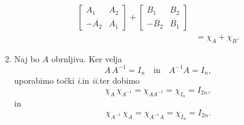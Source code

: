 \documentclass[mat1, tisk]{fmfdelo}
\numberwithin{equation}{section}
\begin{document}
\begin{dokaz}
\begin{enumerate}
\begin{equation*}
\begin{aligned}
\begin{bmatrix}
                        A_{1} & A_{2} \\
                        -\overline{A_{2}} & \overline{A_{1}}
                    \end{bmatrix} 
                    +
                    \begin{bmatrix}
                        B_{1} & B_{2}\\
                        -\overline{B_{2}} & \overline{B_{1}}
                    \end{bmatrix} \\
                    &= \chi_{A} + \chi_{B}.
                \end{aligned}  
        \end{equation*}
        \item Naj bo $A$ obrnljiva. Ker velja
        \[
        A\,A^{-1}=I_n \quad\text{in}\quad A^{-1}A=I_n,
        \]
        uporabimo točki \textit{i}.\@ in \textit{ii}.\@ ter dobimo
        \[
        \chi_A\,\chi_{A^{-1}}
        =\chi_{A A^{-1}}
        =\chi_{I_n}
        =I_{2n},
        \]
        in
        \[
        \chi_{A^{-1}}\,\chi_A
        =\chi_{A^{-1}A}
        =\chi_{I_n}
        =I_{2n}.
        \]
        

\end{enumerate}
\end{dokaz}
\end{document}
